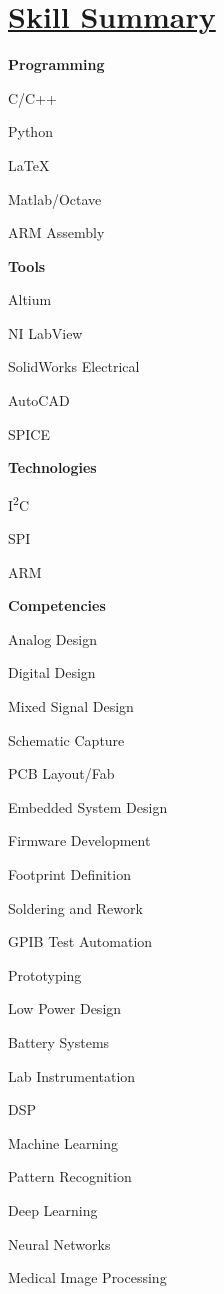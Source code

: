 \documentclass[a4paper, 11pt]{article}
\begin{document}
\section{\underline{Skill Summary}}
  \parbox{0.16\textwidth}{
    \textbf{Programming}\par   
    C/C++\par
    Python\par
    \LaTeX\par
  } 
  \parbox{0.18\textwidth}{
    \bigskip
    Matlab/Octave\par
    ARM Assembly\par    
	\hfill\par    
  }
  \parbox{0.23\textwidth}{
    \textbf{Tools}\par
    Altium\par
    NI LabView\par
    SolidWorks Electrical\par
  }
  \parbox{0.14\textwidth}{
    \bigskip
    AutoCAD\par
    SPICE\par
    \hfill\par
  }
  \parbox{0.15\textwidth}{
    \textbf{Technologies}\par
    I\textsuperscript{2}C\par
    SPI\par
    ARM\par
  }
  \medskip
  
  \parbox{0.23\textwidth}{
    \textbf{Competencies}\par
    Analog Design\par
    Digital Design\par
    Mixed Signal Design\par
    Schematic Capture\par
    PCB Layout/Fab\par
  }
  \parbox{0.26\textwidth}{
    \bigskip
    Embedded System Design\par
    Firmware Development\par
    Footprint Definition\par
    Soldering and Rework\par
    GPIB Test Automation\par
  }
  \parbox{0.21\textwidth}{
    \bigskip
    Prototyping\par
    Low Power Design\par
    Battery Systems\par
    Lab Instrumentation\par
    DSP\par
    }
  \parbox{0.25\textwidth}{
    \bigskip
    Machine Learning\par
    Pattern Recognition\par
    Deep Learning\par
    Neural Networks\par
    Medical Image Processing\par
  }
 
\end{document}
